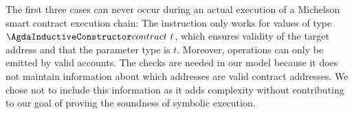 The first three cases can never occur during an actual execution of
a Michelson smart contract execution chain:
The  instruction only works for values of type
$\Acontract~t$, which ensures validity of the target address and that the
parameter type is $t$. Moreover, operations can only be emitted by valid accounts.
The checks are needed in our model because it does not maintain
information about which addresses are valid contract addresses.
We chose not to include this information as it adds complexity
without contributing to our goal of proving the soundness of symbolic
execution. 


